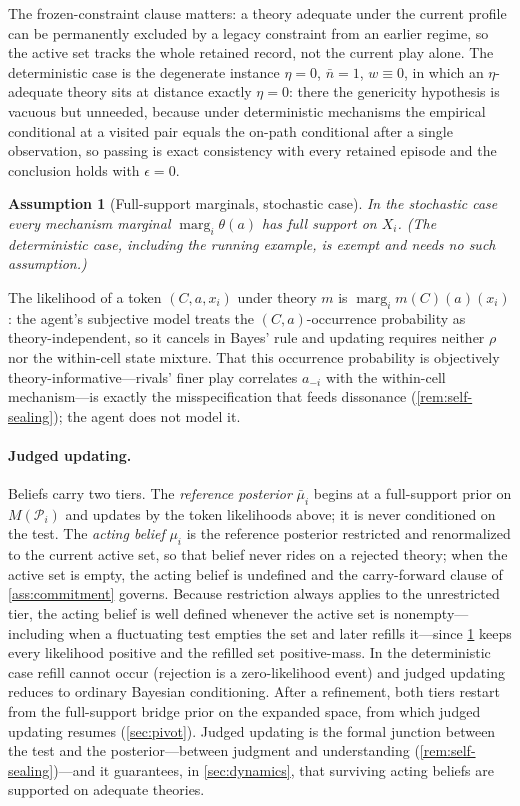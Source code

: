 \documentclass[11pt]{article}
\newtheorem{assumption}{Assumption}[section]
\theoremstyle{definition}
\newcommand{\marg}[1]{\operatorname{marg}_{#1}}
\begin{document}
The frozen-constraint clause matters: a theory adequate under the current
profile can be permanently excluded by a legacy constraint from an earlier
regime, so the active set tracks the whole retained record, not the current
play alone.  The deterministic case is the degenerate instance $\eta=0$,
$\bar n=1$, $w\equiv0$, in which an $\eta$-adequate theory sits at distance
exactly $\eta=0$: there the genericity hypothesis is vacuous but unneeded,
because under deterministic mechanisms the empirical conditional at a visited
pair equals the on-path conditional after a single observation, so passing is
exact consistency with every retained episode and the conclusion holds with
$\epsilon=0$.

\begin{assumption}[Full-support marginals, stochastic case]
\label{ass:full-support}
In the stochastic case every mechanism marginal $\marg{i}\theta(a)$ has full
support on $X_i$.  (The deterministic case, including the running example,
is exempt and needs no such assumption.)
\end{assumption}

The likelihood of a token $(C,a,x_i)$ under theory $m$ is
$\marg{i}m(C)(a)(x_i)$: the agent's subjective model treats the
$(C,a)$-occurrence probability as theory-independent, so it cancels in Bayes'
rule and updating requires neither $\rho$ nor the within-cell state mixture.
That this occurrence probability is objectively theory-informative---rivals'
finer play correlates $a_{-i}$ with the within-cell mechanism---is exactly the
misspecification that feeds dissonance (\cref{rem:self-sealing}); the agent
does not model it.

\paragraph{Judged updating.}
Beliefs carry two tiers.  The \emph{reference posterior} $\bar\mu_i$ begins
at a full-support prior on $M(\mathcal P_i)$ and updates by the token
likelihoods above; it is never conditioned on the test.  The \emph{acting
belief} $\mu_i$ is the reference posterior restricted and renormalized to the
current active set, so that belief never rides on a rejected theory; when the
active set is empty, the acting belief is undefined and the carry-forward
clause of \cref{ass:commitment} governs.  Because restriction always applies
to the unrestricted tier, the acting belief is well defined whenever the
active set is nonempty---including when a fluctuating test empties the set and
later refills it---since \cref{ass:full-support} keeps every likelihood
positive and the refilled set positive-mass.  In the deterministic case
refill cannot occur (rejection is a zero-likelihood event) and judged updating
reduces to ordinary Bayesian conditioning.  After a refinement, both tiers
restart from the full-support bridge prior on the expanded space, from which
judged updating resumes (\cref{sec:pivot}).  Judged updating is the formal
junction between the test and the posterior---between judgment and
understanding (\cref{rem:self-sealing})---and it guarantees, in
\cref{sec:dynamics}, that surviving acting beliefs are supported on adequate
theories.
\end{document}
